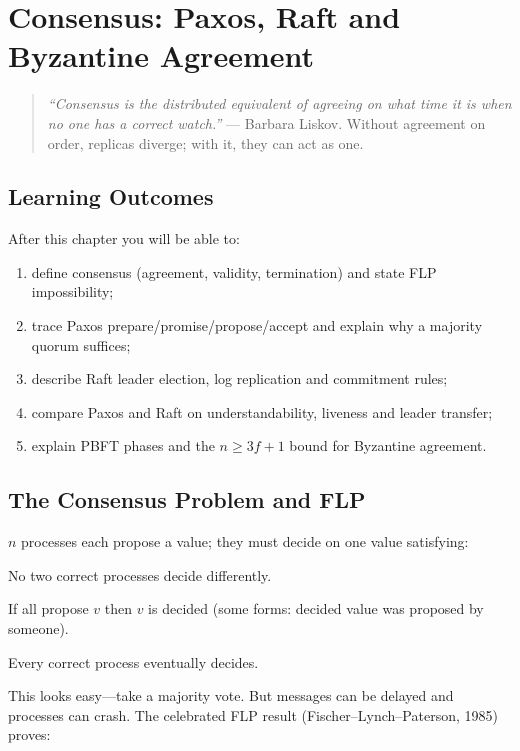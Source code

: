 \chapter{Consensus: Paxos, Raft and Byzantine Agreement}
\label{ch:consensus}

\begin{quote}
\emph{``Consensus is the distributed equivalent of agreeing on what time it is when no one has a correct watch.''} --- Barbara Liskov. Without agreement on order, replicas diverge; with it, they can act as one.
\end{quote}

\noindent{}
\vspace{0.4em}

\section*{Learning Outcomes}
After this chapter you will be able to:
\begin{enumerate}[label=(L\arabic*)]
    \item define consensus (agreement, validity, termination) and state FLP impossibility;
    \item trace Paxos prepare/promise/propose/accept and explain why a majority quorum suffices;
    \item describe Raft leader election, log replication and commitment rules;
    \item compare Paxos and Raft on understandability, liveness and leader transfer;
    \item explain PBFT phases and the $n\ge 3f+1$ bound for Byzantine agreement.
\end{enumerate}

\section{The Consensus Problem and FLP}
\label{sec:consensus-def}
$n$ processes each propose a value; they must decide on one value satisfying:
\begin{description}[leftmargin=1.2em,style=nextline]
    \item[Agreement] No two correct processes decide differently.
    \item[Validity] If all propose $v$ then $v$ is decided (some forms: decided value was proposed by someone).
    \item[Termination] Every correct process eventually decides.
\end{description}
This looks easy---take a majority vote. But messages can be delayed and processes can crash. The celebrated FLP result (Fischer--Lynch--Paterson, 1985) proves:

